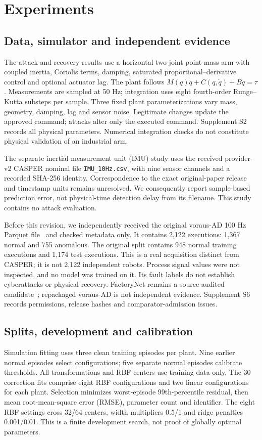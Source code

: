 \documentclass[11pt]{article}
\begin{document}
\section{Experiments}
\subsection{Data, simulator and independent evidence}
The attack and recovery results use a horizontal two-joint point-mass arm with coupled inertia, Coriolis terms, damping, saturated proportional--derivative control and optional actuator lag. The plant follows $M(q)\ddot q+C(q,\dot q)+B\dot q=\tau$. Measurements are sampled at 50 Hz; integration uses eight fourth-order Runge--Kutta substeps per sample. Three fixed plant parameterizations vary mass, geometry, damping, lag and sensor noise. Legitimate changes update the approved command; attacks alter only the executed command. Supplement S2 records all physical parameters. Numerical integration checks do not constitute physical validation of an industrial arm.

The separate inertial measurement unit (IMU) study uses the received provider-v2 CASPER nominal file \texttt{IMU\_10Hz.csv}, with nine sensor channels and a recorded SHA-256 identity. Correspondence to the exact original-paper release and timestamp units remains unresolved. We consequently report sample-based prediction error, not physical-time detection delay from its filename. This study contains no attack evaluation.

Before this revision, we independently received the original voraus-AD 100 Hz Parquet file~\cite{voraus} and checked metadata only. It contains 2,122 executions: 1,367 normal and 755 anomalous. The original split contains 948 normal training executions and 1,174 test executions. This is a real acquisition distinct from CASPER; it is not 2,122 independent robots. Process signal values were not inspected, and no model was trained on it. Its fault labels do not establish cyberattacks or physical recovery. FactoryNet remains a source-audited candidate~\cite{factory}; repackaged voraus-AD is not independent evidence. Supplement S6 records permissions, release hashes and comparator-admission issues.

\subsection{Splits, development and calibration}
Simulation fitting uses three clean training episodes per plant. Nine earlier normal episodes select configurations; five separate normal episodes calibrate thresholds. All transformations and RBF centers use training data only. The 30 correction fits comprise eight RBF configurations and two linear configurations for each plant. Selection minimizes worst-episode 99th-percentile residual, then mean root-mean-square error (RMSE), parameter count and identifier. The eight RBF settings cross 32/64 centers, width multipliers 0.5/1 and ridge penalties 0.001/0.01. This is a finite development search, not proof of globally optimal parameters.
\end{document}
